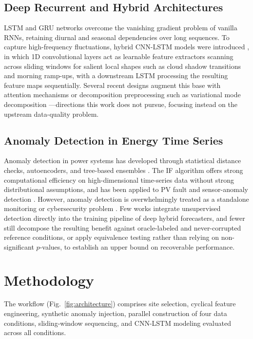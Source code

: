 \documentclass[conference]{IEEEtran}
\begin{document}
\subsection{Deep Recurrent and Hybrid Architectures}
LSTM \cite{hochreiter1997lstm} and GRU networks overcome the vanishing gradient problem of vanilla RNNs, retaining diurnal and seasonal dependencies over long sequences. To capture high-frequency fluctuations, hybrid CNN-LSTM models were introduced \cite{zang2020cnnlstm, obiora2021hourly, qu2021dayahead, boucetta2024enhanced, zhou2024enhancing}, in which 1D convolutional layers act as learnable feature extractors scanning across sliding windows for salient local shapes such as cloud shadow transitions and morning ramp-ups, with a downstream LSTM processing the resulting feature maps sequentially. Several recent designs augment this base with attention mechanisms \cite{qu2021dayahead, zhou2024enhancing} or decomposition preprocessing such as variational mode decomposition \cite{boucetta2024enhanced}---directions this work does not pursue, focusing instead on the upstream data-quality problem.

\subsection{Anomaly Detection in Energy Time Series}
Anomaly detection in power systems has developed through statistical distance checks, autoencoders, and tree-based ensembles \cite{zhang2021survey}. The IF algorithm \cite{liu2008isolation} offers strong computational efficiency on high-dimensional time-series data without strong distributional assumptions, and has been applied to PV fault and sensor-anomaly detection \cite{jorry2026unsupervised}. However, anomaly detection is overwhelmingly treated as a standalone monitoring or cybersecurity problem \cite{zhang2021survey}. Few works integrate unsupervised detection directly into the training pipeline of deep hybrid forecasters, and fewer still decompose the resulting benefit against oracle-labeled and never-corrupted reference conditions, or apply equivalence testing rather than relying on non-significant $p$-values, to establish an upper bound on recoverable performance.

\section{Methodology}

The workflow (Fig.~\ref{fig:architecture}) comprises site selection, cyclical feature engineering, synthetic anomaly injection, parallel construction of four data conditions, sliding-window sequencing, and CNN-LSTM modeling evaluated across all conditions.
\end{document}
